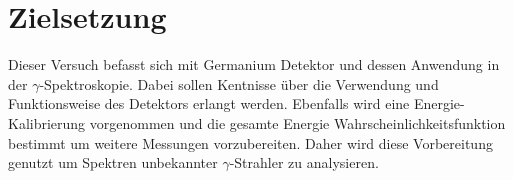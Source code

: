 \chapter{Zielsetzung}
\label{cha:zielsetzung}

Dieser Versuch befasst sich mit Germanium Detektor und dessen Anwendung in der $\gamma$-Spektroskopie. Dabei sollen Kentnisse über die Verwendung und Funktionsweise des Detektors 
erlangt werden. Ebenfalls wird eine Energie-Kalibrierung vorgenommen und die gesamte Energie Wahrscheinlichkeitsfunktion bestimmt um weitere Messungen vorzubereiten. Daher wird 
diese Vorbereitung genutzt um Spektren unbekannter $\gamma$-Strahler zu analysieren. \cite{v18}